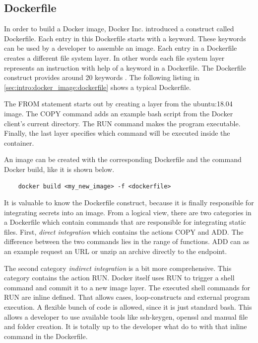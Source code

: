 \subsection{Dockerfile}
\label{sec:intro:docker_image:docker_img:dockerfile}
In order to build a Docker image, Docker Inc. introduced a construct called Dockerfile.
Each entry in this Dockerfile starts with a keyword. These keywords can be used by a developer to assemble an image. Each entry in a Dockerfile creates a different file system layer. In other words each file system layer represents an instruction with help of a keyword in a Dockerfile.
The Dockerfile construct provides around 20 keywords \cite{dockerfile_ref}.
The following listing in \ref{sec:intro:docker_image:dockerfile} shows a typical Dockerfile.

The FROM statement starts out by creating a layer from the ubuntu:18.04 image. The COPY command adds an example bash script from the Docker client’s current directory. The RUN command makes the program executable. Finally, the last layer specifies which command will be executed inside the container.

An image can be created with the corresponding Dockerfile and the command Docker build, like it is shown below.
\begin{lstlisting}
	docker build <my_new_image> -f <dockerfile>
\end{lstlisting}
It is valuable to know the Dockerfile construct, because it is finally responsible for integrating secrets into an image. 
From a logical view, there are two categories in a Dockerfile which contain commands that are responsible for integrating static files.
First, \textit{direct integration} which contains the actions COPY and ADD. The difference between the two commands lies in the range of functions. ADD can as an example request an URL or unzip an archive directly to the endpoint.

The second category \textit{indirect integration} is a bit more comprehensive. This category contains the action RUN.
Docker itself uses RUN to trigger a shell command and commit it to a new image layer.
The executed shell commands for RUN are inline defined. That allows cases, loop-constructs and external program execution. A flexible bunch of code is allowed, since it is just standard bash. This allows a developer to use available tools like ssh-keygen, openssl and manual file and folder creation. It is totally up to the developer what do to with that inline command in the Dockerfile. 


